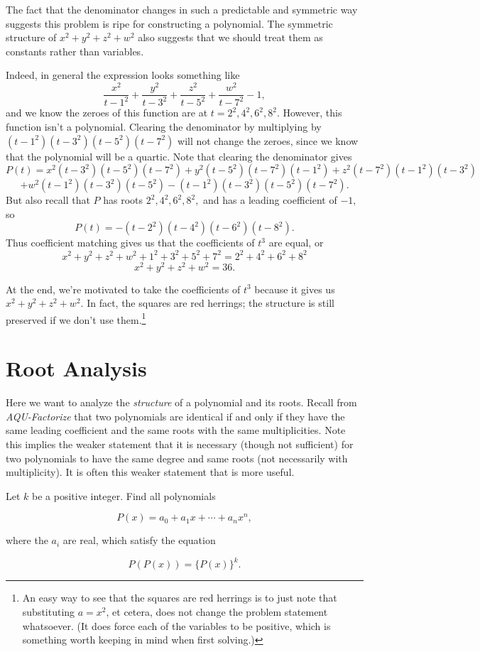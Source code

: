 \documentclass[mast]{lucky}
\begin{document}
\begin{sol}
The fact that the denominator changes in such a predictable and symmetric way suggests this problem is ripe for constructing a polynomial. The symmetric structure of $x^2+y^2+z^2+w^2$ also suggests that we should treat them as constants rather than variables.

Indeed, in general the expression looks something like
\[\frac{x^2}{t-1^2}+\frac{y^2}{t-3^2}+\frac{z^2}{t-5^2}+\frac{w^2}{t-7^2}-1,\]
and we know the zeroes of this function are at $t=2^2,4^2,6^2,8^2.$ However, this function isn't a polynomial. Clearing the denominator by multiplying by $(t-1^2)(t-3^2)(t-5^2)(t-7^2)$ will not change the zeroes, since we know that the polynomial will be a quartic. Note that clearing the denominator gives
\[P(t)=x^2(t-3^2)(t-5^2)(t-7^2)+y^2(t-5^2)(t-7^2)(t-1^2)+z^2(t-7^2)(t-1^2)(t-3^2)\]
\[+w^2(t-1^2)(t-3^2)(t-5^2)-(t-1^2)(t-3^2)(t-5^2)(t-7^2).\]
But also recall that $P$ has roots $2^2,4^2,6^2,8^2,$ and has a leading coefficient of $-1,$ so
\[P(t)=-(t-2^2)(t-4^2)(t-6^2)(t-8^2).\]
Thus coefficient matching gives us that the coefficients of $t^3$ are equal, or
\[x^2+y^2+z^2+w^2+1^2+3^2+5^2+7^2=2^2+4^2+6^2+8^2\]
\[x^2+y^2+z^2+w^2=36.\]
\end{sol}

At the end, we're motivated to take the coefficients of $t^3$ because it gives us $x^2+y^2+z^2+w^2.$ In fact, the squares are red herrings; the structure is still preserved if we don't use them.\footnote{An easy way to see that the squares are red herrings is to just note that substituting $a=x^2$, et cetera, does not change the problem statement whatsoever. (It does force each of the variables to be positive, which is something worth keeping in mind when first solving.)}

\section{Root Analysis}

Here we want to analyze the \textit{structure} of a polynomial and its roots. Recall from \emph{AQU-Factorize} that two polynomials are identical if and only if they have the same leading coefficient and the same roots with the same multiplicities. Note this implies the weaker statement that it is necessary (though not sufficient) for two polynomials to have the same degree and same roots (not necessarily with multiplicity). It is often this weaker statement that is more useful.

\begin{exam}[Canada]
Let $ k$ be a positive integer. Find all polynomials

\[ P(x) = a_0 + a_1 x + \cdots + a_n x^n,\]

where the $ a_i$ are real, which satisfy the equation

\[P(P(x)) = \{ P(x) \}^k.\]
\end{exam}
\end{document}
